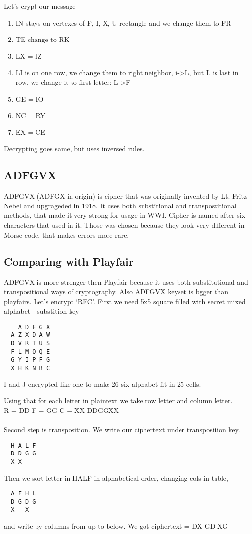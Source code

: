 \documentclass[10pt]{article}
\begin{document}
  Let's crypt our message
  \begin{enumerate}
  	\item IN stays on vertexes of {F, I, X, U} rectangle and we change them to FR
  	\item TE change to RK
  	\item LX = IZ
  	\item LI is on one row, we change them to right neighbor, i->L, but L is last in row, we change it to first letter: L->F
  	\item GE = IO
  	\item NC = RY
  	\item EX = CE
  \end{enumerate}

  Decrypting goes same, but uses inversed rules.

  \subsection{ADFGVX}
  ADFGVX (ADFGX in origin) is cipher that was originally invented by Lt. Fritz Nebel and upgrageded in 1918. It uses both substitional and transpostitional methods, that made it very strong for usage in WWI. 
  Cipher is named after six characters that used in it. Those was chosen because they look very different in Morse code, that makes errors more rare.
  \subsection{Comparing with Playfair}
  ADFGVX is more stronger then Playfair because it uses both substitutional and transpositional ways of cryptography. Also ADFGVX keyset is bgger than playfairs.
  Let's encrypt `RFC'.
  First we need 5x5 square filled with secret mixed alphabet - substition key


  \begin{verbatim}
  	A D F G X
  A Z X D A W
  D V R T U S
  F L M O Q E
  G Y I P F G
  X H K N B C
  \end{verbatim}

  I and J encrypted like one to make 26 six alphabet fit in 25 cells.

  Using that for each letter in plaintext we take row letter and column letter. \\
  R = DD F = GG C = XX
  DDGGXX \\ \\
  Second step is transposition.
  We write our ciphertext under transposition key.
  \begin{verbatim}
  H A L F
  D D G G
  X X
  \end{verbatim}
  Then we sort letter in HALF in alphabetical order, changing cols in table,
  \begin{verbatim}
  A F H L 
  D G D G 
  X   X
  \end{verbatim}
  and write by columns from up to below.
  We got ciphertext = DX GD XG
\end{document}

